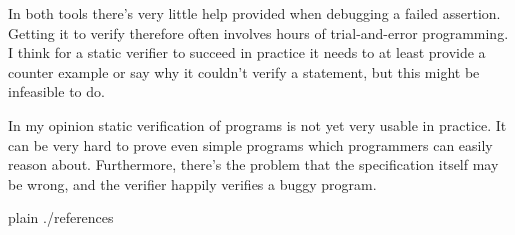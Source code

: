 \documentclass[a4paper,10pt]{article}
\begin{document}
In both tools there's very little help provided when debugging a failed assertion.
Getting it to verify therefore often involves hours of trial-and-error programming.
I think for a static verifier to succeed in practice it needs to at least provide a counter example 
or say why it couldn't verify a statement, but this might be infeasible to do.

In my opinion static verification of programs is not yet very usable in practice.
It can be very hard to prove even simple programs which programmers can easily reason about.
Furthermore, there's the problem that the specification itself may be wrong, and the verifier happily verifies a buggy program.

\begin{flushleft}
{{{
 {plain}
 {./references}
}}}
\end{flushleft}


\todos
\end{document}
